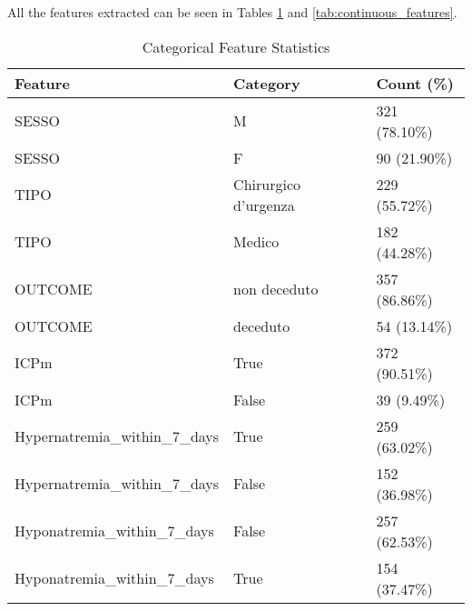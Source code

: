 All the features extracted can be seen in Tables \ref{tab:categorical_features} and \ref{tab:continuous_features}.
\begin{table}[h!]
	\centering
	\tiny %
	\begin{tabular}{lll}
		\hline
		\textbf{Feature} & \textbf{Category} & \textbf{Count (\%)} \\ \hline
		SESSO & M & 321 (78.10\%) \\
		SESSO & F & 90 (21.90\%) \\
		TIPO & Chirurgico d’urgenza & 229 (55.72\%) \\
		TIPO & Medico & 182 (44.28\%) \\
		OUTCOME & non deceduto & 357 (86.86\%) \\
		OUTCOME & deceduto & 54 (13.14\%) \\
		ICPm & True & 372 (90.51\%) \\
		ICPm & False & 39 (9.49\%) \\
		Hypernatremia\_within\_7\_days & True & 259 (63.02\%) \\
		Hypernatremia\_within\_7\_days & False & 152 (36.98\%) \\
		Hyponatremia\_within\_7\_days & False & 257 (62.53\%) \\
		Hyponatremia\_within\_7\_days & True & 154 (37.47\%) \\
		\hline
	\end{tabular}
	\caption{Categorical Feature Statistics}
	\label{tab:categorical_features}
\end{table}


